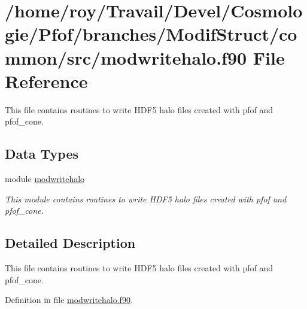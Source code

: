 \hypertarget{modwritehalo_8f90}{\section{/home/roy/\-Travail/\-Devel/\-Cosmologie/\-Pfof/branches/\-Modif\-Struct/common/src/modwritehalo.f90 File Reference}
\label{modwritehalo_8f90}
}


This file contains routines to write H\-D\-F5 halo files created with pfof and pfof\-\_\-cone.  


\subsection*{Data Types}
\begin{DoxyCompactItemize}
\item 
module \hyperlink{classmodwritehalo}{modwritehalo}
\begin{DoxyCompactList}\small\item\em This module contains routines to write H\-D\-F5 halo files created with pfof and pfof\-\_\-cone. \end{DoxyCompactList}\end{DoxyCompactItemize}


\subsection{Detailed Description}
This file contains routines to write H\-D\-F5 halo files created with pfof and pfof\-\_\-cone. 

Definition in file \hyperlink{modwritehalo_8f90_source}{modwritehalo.\-f90}.

